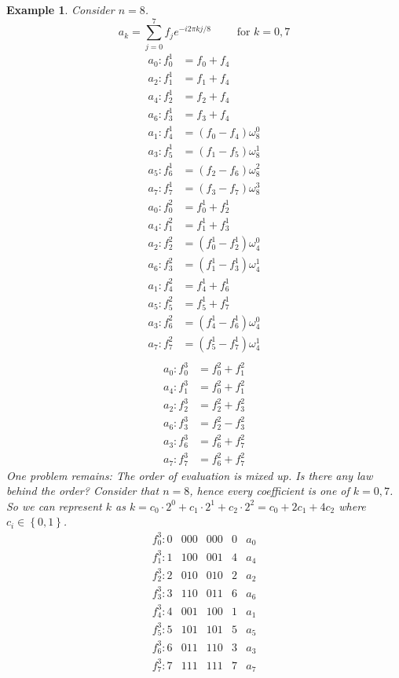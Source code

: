 \documentclass{article}
\newtheorem{example}{Example}
\newcommand{\set}[1]{\left\{#1\right\}}
\begin{document}
\begin{example}
  Consider $n=8$.
  \[ a_k = \sum_{j=0}^7 f_j e^{-i2\pi kj/8} \qquad \text{ for } k = 0,7 \]
  \begin{align*}
    a_0: f_0^1 &= f_0 + f_4 \\
    a_2: f_1^1 &= f_1 + f_4 \\
    a_4: f_2^1 &= f_2 + f_4 \\
    a_6: f_3^1 &= f_3 + f_4 \\
  \hline
    a_1: f_4^1 &= (f_0 - f_4) \omega_8^0 \\
    a_3: f_5^1 &= (f_1 - f_5) \omega_8^1 \\
    a_5: f_6^1 &= (f_2 - f_6) \omega_8^2 \\
    a_7: f_7^1 &= (f_3 - f_7) \omega_8^3
  \end{align*}
  \begin{align*}
    a_0: f_0^2 &= f_0^1 + f_2^1 \\
    a_4: f_1^2 &= f_1^1 + f_3^1 \\
  \hline
    a_2: f_2^2 &= (f_0^1 - f_2^1) \omega_4^0 \\
    a_6: f_3^2 &= (f_1^1 - f_3^1) \omega_4^1 \\
  \hline
    a_1: f_4^2 &= f_4^1 + f_6^1 \\
    a_5: f_5^2 &= f_5^1 + f_7^1 \\
  \hline
    a_3: f_6^2 &= (f_4^1 - f_6^1) \omega_4^0 \\
    a_7: f_7^2 &= (f_5^1 - f_7^1) \omega_4^1 \\
  \end{align*}
  \begin{align*}
    a_0: f_0^3 &= f_0^2 + f_1^2 \\
    a_4: f_1^3 &= f_0^2 + f_1^2 \\
  \hline
    a_2: f_2^3 &= f_2^2 + f_3^2 \\
    a_6: f_3^3 &= f_2^2 - f_3^2 \\
  \hline
    a_3: f_6^3 &= f_6^2 + f_7^2 \\
    a_7: f_7^3 &= f_6^2 + f_7^2
  \end{align*}
  One problem remains: The order of evaluation is mixed up.
  Is there any law behind the order?
  Consider that $n=8$, hence every coefficient is one of $k=0,7$.
  So we can represent $k$ as $k = c_0 \cdot 2^0 + c_1 \cdot 2^1 + c_2 \cdot 2^2 = c_0 + 2c_1 + 4c_2$
  where $c_i \in \set{0,1}$.
  \begin{align*}
    f_0^3: 0 & 000 & 000 & 0 & a_0 \\
    f_1^3: 1 & 100 & 001 & 4 & a_4 \\
    f_2^3: 2 & 010 & 010 & 2 & a_2 \\
    f_3^3: 3 & 110 & 011 & 6 & a_6 \\
    f_4^3: 4 & 001 & 100 & 1 & a_1 \\
    f_5^3: 5 & 101 & 101 & 5 & a_5 \\
    f_6^3: 6 & 011 & 110 & 3 & a_3 \\
    f_7^3: 7 & 111 & 111 & 7 & a_7 \\
  \end{align*}
\end{example}
\end{document}
